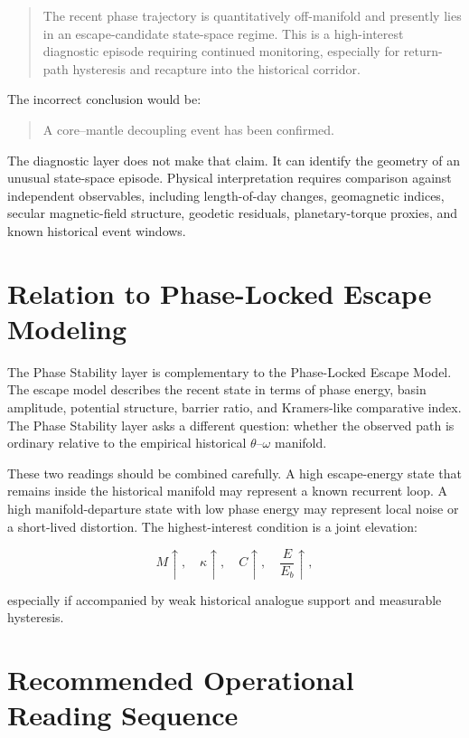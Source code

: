 \documentclass[11pt]{article}
\begin{document}
\begin{quote}
The recent phase trajectory is quantitatively off-manifold and presently lies in an escape-candidate state-space regime. This is a high-interest diagnostic episode requiring continued monitoring, especially for return-path hysteresis and recapture into the historical corridor.
\end{quote}

The incorrect conclusion would be:

\begin{quote}
A core--mantle decoupling event has been confirmed.
\end{quote}

The diagnostic layer does not make that claim. It can identify the geometry of an unusual state-space episode. Physical interpretation requires comparison against independent observables, including length-of-day changes, geomagnetic indices, secular magnetic-field structure, geodetic residuals, planetary-torque proxies, and known historical event windows.

\section{Relation to Phase-Locked Escape Modeling}

The Phase Stability layer is complementary to the Phase-Locked Escape Model. The escape model describes the recent state in terms of phase energy, basin amplitude, potential structure, barrier ratio, and Kramers-like comparative index. The Phase Stability layer asks a different question: whether the observed path is ordinary relative to the empirical historical \(\theta\)--\(\omega\) manifold.

These two readings should be combined carefully. A high escape-energy state that remains inside the historical manifold may represent a known recurrent loop. A high manifold-departure state with low phase energy may represent local noise or a short-lived distortion. The highest-interest condition is a joint elevation:

\begin{equation}
M \uparrow,\quad
\kappa \uparrow,\quad
C \uparrow,\quad
\frac{E}{E_b} \uparrow,
\end{equation}

especially if accompanied by weak historical analogue support and measurable hysteresis.

\section{Recommended Operational Reading Sequence}
\end{document}
